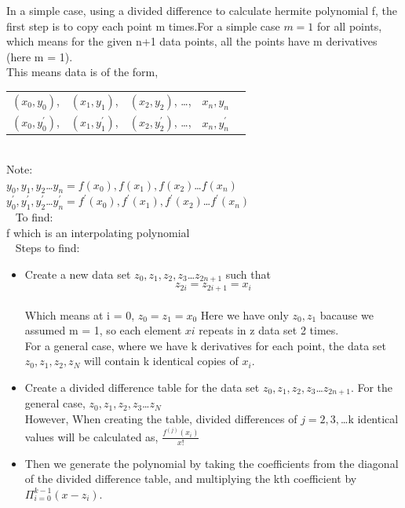 \documentclass[12pt]{article}
\begin{document}
In a simple case, using a divided difference to calculate hermite polynomial f, the first step is to copy each point m times.For a simple case $m = 1$ for all points, which means for the given n+1 data points, all the points have m derivatives (here m = 1).\\ 

This means data is of the form,

\renewcommand{\arraystretch}{1.2}
\noindent
\begin{tabular}{l l l l l} 
	\toprule		
	\midrule 
	$(x_0,y_0)$,& $(x_1,y_1)$, & $(x_2,y_2)$, \dots, & $x_{n}, y_{n}$\\
	$(x_0,y_0 ^{'})$,& $(x_1,y_1 ^{'})$, & $(x_2,y_2 ^{'})$, \dots, & $x_{n}, y_{n} ^{'}$\\
	\bottomrule
\end{tabular}\\
 Note:\\
 $y_0, y_1, y_2$\dots$y_n = f(x_0), f(x_1), f(x_2)$\dots$f(x_n)$\\
 $y_0 ^{'}, y_1 ^{'}, y_2 ^{'}$\dots$y_n ^{'} = f ^{'}(x_0), f ^{'}(x_1), f ^{'}(x_2)$\dots$f ^{'}(x_n)$\\
~\newline
To find:\\
f which is an interpolating polynomial\\
~\newline
Steps to find:\\
\begin{itemize}
	\item Create a new data set $z_0,z_1,z_2,z_3$\dots$z_{2n+1}$ such that 
	\begin{equation*}
	z_{2i} = z_{2i+1} = x_i
	\end{equation*}\\
	Which means at i = 0, $z_0 = z_1 = x_0$
	Here we have only $z_0,z_1$ bacause we assumed m = 1, so each element $xi$ repeats in z data set 2 times.\\
	For a general case, where we have k derivatives for each point, the data set $z_0,z_1,z_2,z_N$ will contain k identical copies of $x_i$.\\
	\item Create a divided difference table for the data set $z_0,z_1,z_2,z_3$\dots$z_{2n+1}$. For the general case, $z_0,z_1,z_2,z_3$\dots$z_{N}$\\
	However, When creating the table, divided differences of $j = 2,3,$\dots k 
	identical values will be calculated as,
	$\frac{f^{(j)}(x_i)}{x!}$
	
	\item Then we generate the polynomial by taking the coefficients from the diagonal of the divided difference table, and multiplying the kth coefficient by $\Pi_{i=0} ^{k-1}(x-z_i)$.
	
\end{itemize} 
 
\end{document}
